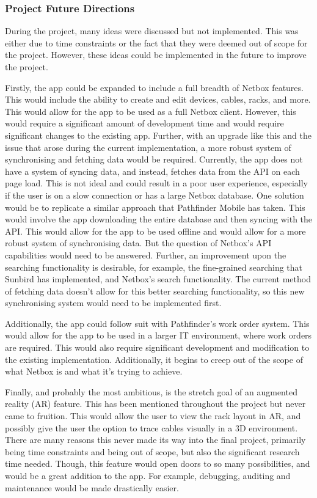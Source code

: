 \documentclass [11pt,a4paper]{article}
\begin{document}
\subsubsection{Project Future Directions}
\label{sec:future_directions}
During the project, many ideas were discussed but not implemented. This was either due to time constraints or the fact that they were deemed out of scope for the project. However, these ideas could be implemented in the future to improve the project.

Firstly, the app could be expanded to include a full breadth of Netbox features. This would include the ability to create and edit devices, cables, racks, and more. This would allow for the app to be used as a full Netbox client. However, this would require a significant amount of development time and would require significant changes to the existing app. Further, with an upgrade like this and the issue that arose during the current implementation, a more robust system of synchronising and fetching data would be required. Currently, the app does not have a system of syncing data, and instead, fetches data from the API on each page load. This is not ideal and could result in a poor user experience, especially if the user is on a slow connection or has a large Netbox database. One solution would be to replicate a similar approach that Pathfinder Mobile has taken. This would involve the app downloading the entire database and then syncing with the API. This would allow for the app to be used offline and would allow for a more robust system of synchronising data. But the question of Netbox's API capabilities would need to be answered. Further, an improvement upon the searching functionality is desirable, for example, the fine-grained searching that Sunbird has implemented, and Netbox's search functionality. The current method of fetching data doesn't allow for this better searching functionality, so this new synchronising system would need to be implemented first.

Additionally, the app could follow suit with Pathfinder's work order system. This would allow for the app to be used in a larger IT environment, where work orders are required. This would also require significant development and modification to the existing implementation. Additionally, it begins to creep out of the scope of what Netbox is and what it's trying to achieve.

Finally, and probably the most ambitious, is the stretch goal of an augmented reality (AR) feature. This has been mentioned throughout the project but never came to fruition. This would allow the user to view the rack layout in AR, and possibly give the user the option to trace cables visually in a 3D environment. There are many reasons this never made its way into the final project, primarily being time constraints and being out of scope, but also the significant research time needed. Though, this feature would open doors to so many possibilities, and would be a great addition to the app. For example, debugging, auditing and maintenance would be made drastically easier. 
\end{document}

